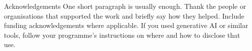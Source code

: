 \begin{frontmatterpage}{Acknowledgements}
One short paragraph is usually enough. Thank the people or organisations that supported the work and briefly say how they helped. Include funding acknowledgements where applicable. If you used generative AI or similar tools, follow your programme's instructions on where and how to disclose that use.
\end{frontmatterpage}